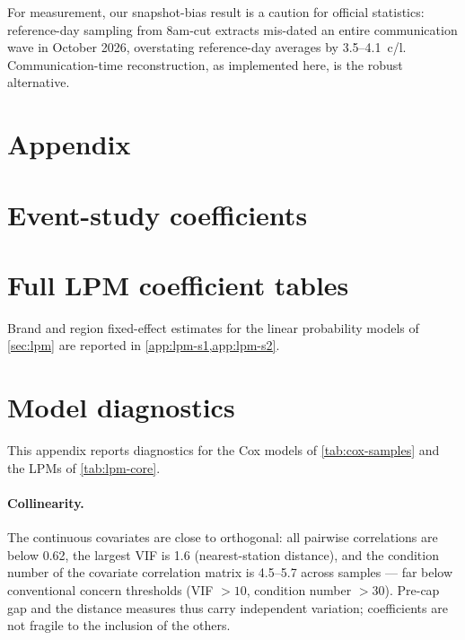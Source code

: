 \documentclass[11pt]{article}
\begin{document}
For measurement, our snapshot-bias result is a caution for official
statistics: reference-day sampling from 8am-cut extracts mis-dated an
entire communication wave in October 2026, overstating reference-day
averages by 3.5--4.1~c/l. Communication-time reconstruction, as
implemented here, is the robust alternative.

\printbibliography

\appendix

\section*{Appendix}

\renewcommand{\thesection}{\Alph{section}}
\setcounter{section}{0}

\section{Event-study coefficients}
\label{app:es}



\section{Full LPM coefficient tables}
\label{app:lpm-full}

Brand and region fixed-effect estimates for the linear probability
models of \cref{sec:lpm} are reported in \cref{app:lpm-s1,app:lpm-s2}.



\section{Model diagnostics}
\label{app:diag}

This appendix reports diagnostics for the Cox models of
\cref{tab:cox-samples} and the LPMs of \cref{tab:lpm-core}.

\paragraph{Collinearity.} The continuous covariates are close to
orthogonal: all pairwise correlations are below 0.62, the largest VIF is
1.6 (nearest-station distance), and the condition number of the
covariate correlation matrix is 4.5--5.7 across samples --- far below
conventional concern thresholds (VIF $> 10$, condition number $> 30$).
Pre-cap gap and the distance measures thus carry independent variation;
coefficients are not fragile to the inclusion of the others.
\end{document}
